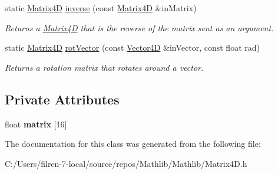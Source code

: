 \begin{DoxyCompactItemize}
\mbox{\label{class_matrix4_d_a49c1f426620d9f48d19954bc695f35c4}} 
static \mbox{\hyperlink{class_matrix4_d}{Matrix4D}} \mbox{\hyperlink{class_matrix4_d_a49c1f426620d9f48d19954bc695f35c4}{inverse}} (const \mbox{\hyperlink{class_matrix4_d}{Matrix4D}} \&in\+Matrix)
\begin{DoxyCompactList}\small\item\em Returns a \mbox{\hyperlink{class_matrix4_d}{Matrix4D}} that is the reverse of the matrix sent as an argument. \end{DoxyCompactList}\item 
\mbox{\label{class_matrix4_d_a58ece1510ee967f68aa6008d5fd9acae}} 
static \mbox{\hyperlink{class_matrix4_d}{Matrix4D}} \mbox{\hyperlink{class_matrix4_d_a58ece1510ee967f68aa6008d5fd9acae}{rot\+Vector}} (const \mbox{\hyperlink{class_vector4_d}{Vector4D}} \&in\+Vector, const float rad)
\begin{DoxyCompactList}\small\item\em Returns a rotation matrix that rotates around a vector. \end{DoxyCompactList}\end{DoxyCompactItemize}
\subsection*{Private Attributes}
\begin{DoxyCompactItemize}
\item 
\mbox{\label{class_matrix4_d_aed18856c8bb4f5398ed55a72d1126713}} 
float {\bfseries matrix} \mbox{[}16\mbox{]}
\end{DoxyCompactItemize}


The documentation for this class was generated from the following file\+:\begin{DoxyCompactItemize}
\item 
C\+:/\+Users/filren-\/7-\/local/source/repos/\+Mathlib/\+Mathlib/Matrix4\+D.\+h\end{DoxyCompactItemize}
